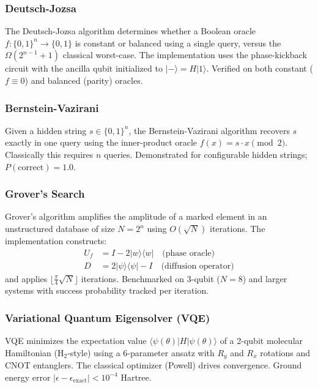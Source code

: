 \documentclass[conference]{IEEEtran}
\begin{document}
\subsubsection{Deutsch-Jozsa}

The Deutsch-Jozsa algorithm determines whether a Boolean oracle $f:\{0,1\}^n \to \{0,1\}$ is constant or balanced using a single query, versus the $\Omega(2^{n-1}+1)$ classical worst-case. The implementation uses the phase-kickback circuit with the ancilla qubit initialized to $|{-}\rangle = H|1\rangle$. Verified on both constant ($f \equiv 0$) and balanced (parity) oracles.

\subsubsection{Bernstein-Vazirani}

Given a hidden string $s \in \{0,1\}^n$, the Bernstein-Vazirani algorithm recovers $s$ exactly in one query using the inner-product oracle $f(x) = s \cdot x \pmod{2}$. Classically this requires $n$ queries. Demonstrated for configurable hidden strings; $P(\text{correct}) = 1.0$.

\subsubsection{Grover's Search}

Grover's algorithm amplifies the amplitude of a marked element in an unstructured database of size $N = 2^n$ using $O(\sqrt{N})$ iterations. The implementation constructs:
\begin{align}
U_f &= I - 2|w\rangle\langle w| \quad \text{(phase oracle)} \\
D &= 2|\psi\rangle\langle\psi| - I \quad \text{(diffusion operator)}
\end{align}
and applies $\lfloor\frac{\pi}{4}\sqrt{N}\rfloor$ iterations. Benchmarked on 3-qubit ($N=8$) and larger systems with success probability tracked per iteration.

\subsubsection{Variational Quantum Eigensolver (VQE)}

VQE minimizes the expectation value $\langle\psi(\theta)|H|\psi(\theta)\rangle$ of a 2-qubit molecular Hamiltonian (H$_2$-style) using a 6-parameter ansatz with $R_y$ and $R_x$ rotations and CNOT entanglers. The classical optimizer (Powell) drives convergence. Ground energy error $|\epsilon - \epsilon_\text{exact}| < 10^{-4}$ Hartree.
\end{document}
